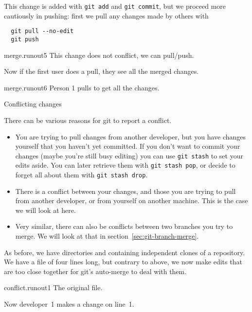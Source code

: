 This change is added with \lstinline{git add} and \lstinline{git commit},
but we proceed more cautiously in pushing: first we pull any changes made by others with
\begin{lstlisting}
  git pull --no-edit
  git push
\end{lstlisting}

\begin{gitstep}{merge.runout5}
  This change does not conflict, we can pull/push.
\end{gitstep}

Now if the first user does a pull, they see all the merged changes.

\begin{gitstep}{merge.runout6}
  Person 1 pulls to get all the changes.
\end{gitstep}

 {Conflicting changes}
\label{sec:git-conflict}

There can be various reasons for git to report a conflict.
\begin{itemize}
\item You are trying to pull changes from another developer, but you have changes
  yourself that you haven't yet committed.
  If you don't want to commit your changes
  (maybe you're still busy editing)
  you can use \lstinline{git stash} to set your edits aside.
  You can later retrieve them with \lstinline{git stash pop},
  or decide to forget all about them with \lstinline{git stash drop}.
\item There is a conflict between your changes, and those you are trying to pull
  from another developer, or from yourself on another machine.
  This is the case we will look at here.
\item Very similar, there can also be conflicts between two branches you try to merge.
  We will look at that in section~\ref{sec:git-branch-merge}.
\end{itemize}

As before, we have directories  and 
containing independent clones of a repository.
We have a file of four lines long, but contrary to above,
we now make edits that are too close together for git's
auto-merge to deal with them.

\begin{gitstep}{conflict.runout1}
  The original file.
\end{gitstep}

Now developer~1 makes a change on line~1.

